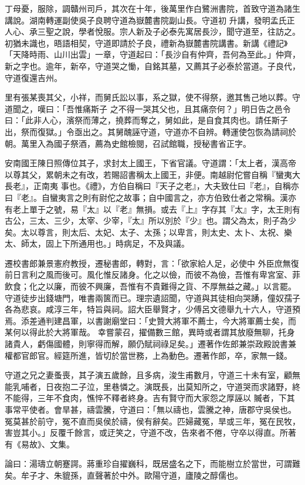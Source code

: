\begin{pinyinscope}
 丁母憂，服除，調贛州司戶，其次在十年，後萬里作白鷺洲書院，首致守道為諸生講說。湖南轉運副使吳子良聘守道為嶽麓書院副山長。守道初
 升講，發明孟氏正人心、承三聖之說，學者悅服。宗人新及子必泰先寓居長沙，聞守道至，往訪之。初猶未識也，晤語相契，守道即請於子良，禮新為嶽麓書院講書。新講《禮記》「天降時雨、山川出雲」一章，守道起曰：「長沙自有仲齊，吾何為至此。」仲齊，新之字也。逾年，新卒，守道哭之慟，自銘其墓，又薦其子必泰於當道。子良代，守道復還吉州。



 里有張某喪其父，小祥，而舅氏訟以事，系之獄，使不得祭，邀其售己地以葬。守道聞之，嘆曰：「吾惟痛斯子
 之不得一哭其父也，且其痛奈何？」明日告之邑令曰：「此非人心，濱祭而薄之，撓葬而奪之，舅如此，是自食其肉也。請任斯子出，祭而復獄。」令亟出之。其舅醜誣守道，守道亦不自辨。轉運使包恢為請祠於朝。萬里入為國子祭酒，薦為史館檢閱，召試館職，授秘書省正字。



 安南國王陳日照傳位其子，求封太上國王，下省官議。守道謂：「太上者，漢高帝以尊其父，累朝未之有改，若賜詔書稱太上國王，非便。南越尉佗嘗自稱『蠻夷大長老』，正南夷
 事也。《禮》，方伯自稱曰『天子之老』，大夫致仕曰『老』，自稱亦曰『老』。自蠻夷言之則有尉佗之故事；自中國言之，亦方伯致仕者之常稱。漢亦有老上單于之號，易『太』以『老』無損。或去『上』字存其『太』字，太王則有古公，三太、三少，太宰、少宰，『太』所以別於『少』也。謂父為太，則子為少矣。太以尊言，則太后、太妃、太子、太孫；以卑言，則太史、太卜、太祝、樂太、師太，固上下所通用也。」時病足，不及與議。



 遷校書郎兼景憲府教授，遷秘書郎，轉對，言：「欲家給人足，必使中
 外臣庶無復前日言利之風而後可。風化惟反諸身。化之以儉，而彼不為儉，吾惟有卑宮室、菲飲食；化之以廉，而彼不興廉，吾惟有不貴難得之貨、不厚無益之藏。」以言罷。守道徒步出錢塘門，唯書兩篋而已。理宗遺詔聞，守道與其徒相向哭踴，僮奴孺子各為悲哀。咸淳三年，特旨與祠。詔大臣舉賢才，少傅呂文德舉九十六人，守道預焉。添差通判建昌軍，以書謝廟堂曰：「史贊大將軍不薦士，今大將軍薦士矣，而某何以得此於大將軍哉。
 幸嘗蒙召，擢備數三館，異時或者謂其放廢無聊，托身諸貴人，虧傷國體，則寧得而解，願仍賦祠祿足矣。」遷著作佐郎兼崇政殿說書兼權都官郎官。經筵所進，皆切於當世務，上為動色。遷著作郎，卒，家無一錢。



 守道之兄之妻蚤喪，其子演五歲餘，且多病，浚生甫數月，守道三十未有室，顧無能乳哺者，日夜抱二子泣，里巷憐之。演既長，出莫知所之，守道哭而求諸野，終不能得，三年不食肉，憔悴不釋者終身。吉有賢守而大家怨之厚誣以
 贓者，下其事常平使者。會旱甚，禱雲騰，守道曰：「無以禱也，雲騰之神，唐郡守吳侯也。冤莫甚於前守，冤不直而吳侯於禱，侯有辭矣。匹婦藏冤，旱或三年，冤在民牧，害豈其小。」反覆千餘言，或迂笑之，守道不改，告來者不倦，守卒以得直。所著有《易故》、文集。



 論曰：湯璹立朝蹇諤。蔣重珍自擢巍科，既居盛名之下，而能樹立於當世，可謂難矣。牟子才、朱貔孫，直聲著於中外。歐陽守道，廬陵之醇儒也。



\end{pinyinscope}
